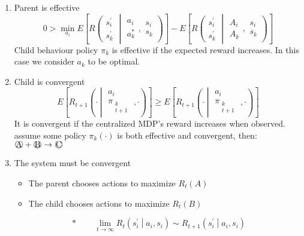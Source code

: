\begin{enumerate}[label=\Alph*)]
\item Parent is effective
\begin{equation*}
0 > \min_{a_i}
E\left[ R\left( \begin{array}{c} s^\prime_i \\ s^\prime_k \end{array} \middle| \begin{array}{c} a_i \\ a^\ast_k \end{array}, \begin{array}{c} s_i \\ s_k \end{array} \right) \right] 
- E\left[ R\left( \begin{array}{c} s^\prime_i \\ s^\prime_k \end{array} \middle| \begin{array}{c} A_i \\ A_k \end{array}, \begin{array}{c} s_i \\ s_k \end{array} \right) \right]
\end{equation*}
Child behaviour policy $\pi_k$ is effective if the expected reward increases. In this case we consider $a_k$ to be optimal.
\item Child is convergent
\begin{equation*}
E\left[ R_{t+1}\left( 
\cdot 
\middle| \begin{array}{c} a_i \\
\pi_{\substack{k\\t+1}} \end{array},\cdot
\right)
\right] \ge E\left[ R_{t+1}\left( \cdot \middle|
\begin{array}{c} a_i \\
 \pi_{\substack{k\\t+1}} \end{array},\cdot\right)\right]
\end{equation*}
It is convergent if the centralized MDP's reward increases when observed.\\
 assume some policy $\pi_k(\cdot)$ is both effective and convergent, then:\\
$\circled{\text{A}}+\circled{\text{B}}\rightarrow\circled{\text{C}}$\\
\item The system must be convergent
\begin{itemize}
\item The parent chooses actions to maximize $R_t(A)$
\item The child chooses actions to maximize $R_t(B)$
\end{itemize}
\begin{equation*}
\boxed{\ast}\qquad \lim_{t\rightarrow\infty} R_t\left( s^\prime_i \middle| a_i, s_i \right) \sim R_{t+1}\left( s^\prime_i \middle| a_i, s_i \right)
\end{equation*}
\end{enumerate}

